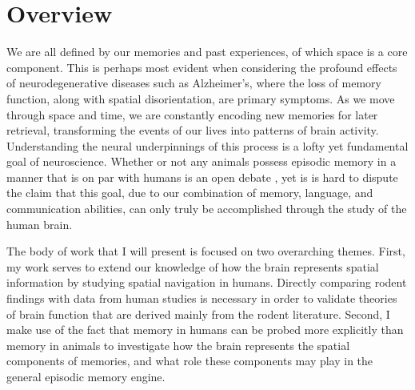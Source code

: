 



\section{Overview}

We are all defined by our memories and past experiences, of which space is a core component. This is perhaps most evident when considering the profound effects of neurodegenerative diseases such as Alzheimer's, where the loss of memory function, along with spatial disorientation, are primary symptoms. As we move through space and time, we are constantly encoding new memories for later retrieval, transforming the events of our lives into patterns of brain activity. Understanding the neural underpinnings of this process is a lofty yet fundamental goal of neuroscience.
Whether or not any animals possess episodic memory in a manner that is on par with humans is an open debate \citep{ClayEtal03}, yet is is hard to dispute the claim that this goal, due to our combination of memory, language, and communication abilities, can only truly be accomplished through the study of the human brain.

The body of work that I will present is focused on two overarching themes. First, my work serves to extend our knowledge of how the brain represents spatial information by studying spatial navigation in humans. Directly comparing rodent findings with data from human studies is necessary in order to validate theories of brain function that are derived mainly from the rodent literature. Second, I make use of the fact that memory in humans can be probed more explicitly than memory in animals to investigate how the brain represents the spatial components of memories, and what role these components may play in the general episodic memory engine.

